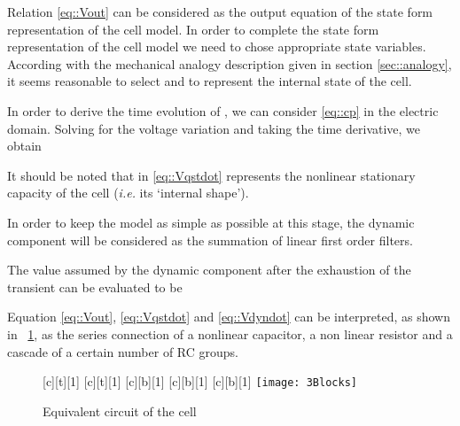 \documentclass[journal]{IEEEtran}
\begin{document}
Relation \eqref{eq::Vout} can be considered as the output equation of the state form representation of the cell model. 
In order to complete the state form representation of the cell model we need to chose appropriate state variables. According with the mechanical analogy description given in section \ref{sec::analogy}, it seems reasonable to select  and  to represent the internal state of the cell.

In order to derive the time evolution of , we can consider \eqref{eq::cp} in the electric domain. Solving for the voltage variation and taking the time derivative, we obtain

It should be noted that  in \eqref{eq::Vqstdot} represents the nonlinear stationary capacity of the cell (\textit{i.e.} its `internal shape').  

In order to keep the model as simple as possible at this stage, the dynamic component  will be considered as the summation of  linear first order filters.

The value assumed by the dynamic component after the exhaustion of the transient can be evaluated to be 
 
Equation \eqref{eq::Vout}, \eqref{eq::Vqstdot} and \eqref{eq::Vdyndot} can be interpreted, as shown in \figurename~\ref{fig::3Blocks}, as the series connection of a nonlinear capacitor, a non linear resistor and a cascade of a certain number of RC groups.
\begin{figure}[!htbp]
    [c][t][1]{}
    [c][t][1]{}
    [c][b][1]{}
    [c][b][1]{}
    [c][b][1]{}
	\centering
	\texttt{[image: 3Blocks]}
	\caption{Equivalent circuit of the cell}
	\label{fig::3Blocks}
\end{figure}
\end{document}
